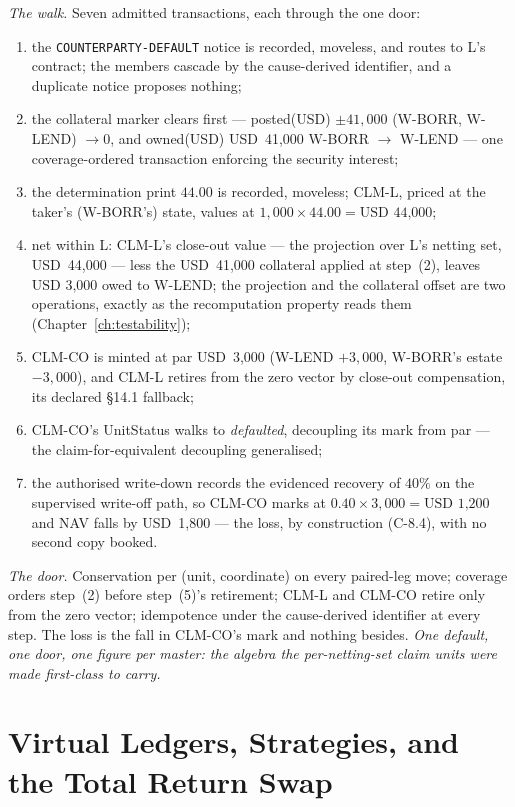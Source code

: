 \documentclass[11pt,a4paper]{article}
\newcommand{\USD}[1]{\mbox{USD~#1}}
\begin{document}
\emph{The walk.} Seven admitted transactions, each through the one door:
\begin{enumerate}[label=(\arabic*),nosep]
\item the \texttt{COUNTERPARTY-DEFAULT} notice is recorded, moveless, and routes to L's
  contract; the members cascade by the cause-derived identifier, and a duplicate notice
  proposes nothing;
\item the collateral marker clears first --- posted(USD) $\pm 41{,}000$ (W-BORR, W-LEND)
  $\to 0$, and owned(USD) \USD{41,000} W-BORR $\to$ W-LEND --- one coverage-ordered
  transaction enforcing the security interest;
\item the determination print $44.00$ is recorded, moveless; CLM-L, priced at the taker's
  (W-BORR's) state, values at $1{,}000 \times 44.00 = \USD{44,000}$;
\item net within L: CLM-L's close-out value --- the projection over L's netting set,
  \USD{44,000} --- less the \USD{41,000} collateral applied at step~(2), leaves
  $\USD{3,000}$ owed to W-LEND; the projection and the collateral offset are two
  operations, exactly as the recomputation property reads them
  (Chapter~\ref{ch:testability});
\item CLM-CO is minted at par \USD{3,000} (W-LEND $+3{,}000$, W-BORR's estate $-3{,}000$),
  and CLM-L retires from the zero vector by close-out compensation, its declared \S14.1
  fallback;
\item CLM-CO's UnitStatus walks to \emph{defaulted}, decoupling its mark from par --- the
  claim-for-equivalent decoupling generalised;
\item the authorised write-down records the evidenced recovery of $40\%$ on the supervised
  write-off path, so CLM-CO marks at $0.40 \times 3{,}000 = \USD{1,200}$ and NAV falls by
  \USD{1,800} --- the loss, by construction (C-8.4), with no second copy booked.
\end{enumerate}

\emph{The door.} Conservation per (unit, coordinate) on every paired-leg move; coverage
orders step~(2) before step~(5)'s retirement; CLM-L and CLM-CO retire only from the zero
vector; idempotence under the cause-derived identifier at every step. The loss is the fall
in CLM-CO's mark and nothing besides.
\emph{One default, one door, one figure per master: the algebra the per-netting-set claim
units were made first-class to carry.}

\section{Virtual Ledgers, Strategies, and the Total Return Swap}
\label{ch:virtual}
\end{document}

